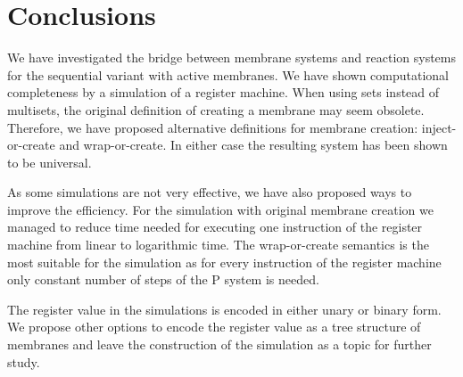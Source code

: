 \documentclass[llncs,submission,copyright,creativecommons]{../lib/lncs/llncs}
\begin{document}
\section*{Conclusions} %
\label{sec:conclusions}

We have investigated the bridge between membrane systems and reaction systems for the sequential variant with active membranes. We have shown computational completeness by a simulation of a register machine. When using sets instead of multisets, the original definition of creating a membrane may seem obsolete. Therefore, we have proposed alternative definitions for membrane creation: inject-or-create and wrap-or-create. In either case the resulting system has been shown to be universal.

As some simulations are not very effective, we have also proposed ways to improve the efficiency. For the simulation with original membrane creation we managed to reduce time needed for executing one instruction of the register machine from linear to logarithmic time. The wrap-or-create semantics is the most suitable for the simulation as for every instruction of the register machine only constant number of steps of the P system is needed.

The register value in the simulations is encoded in either unary or binary form. We propose other options to encode the register value as a tree structure of membranes and leave the construction of the simulation as a topic for further study.



\end{document}
